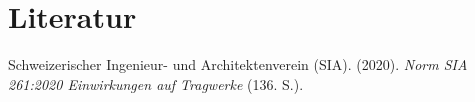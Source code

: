 \documentclass[
  letterpaper,
  DIV=11]{scrreprt}
\newlength{\cslhangindent}
\newlength{\cslentryspacingunit} %
\newenvironment{CSLReferences}[2] %
 {%
  \setlength{\parindent}{0pt}
  \ifodd #1
  \let\oldpar\par
  \def\par{\hangindent=\cslhangindent\oldpar}
  \fi
  \setlength{\parskip}{#2\cslentryspacingunit}
 }%
 {}
\begin{document}

\hypertarget{literatur}{%
\chapter*{Literatur}\label{literatur}}


\hypertarget{refs}{}
\begin{CSLReferences}{1}{0}
\leavevmode{}%
Schweizerischer Ingenieur- und Architektenverein (SIA). (2020).
\emph{{Norm SIA 261:2020 Einwirkungen auf Tragwerke }} (136. S.).

\end{CSLReferences}
\end{document}
